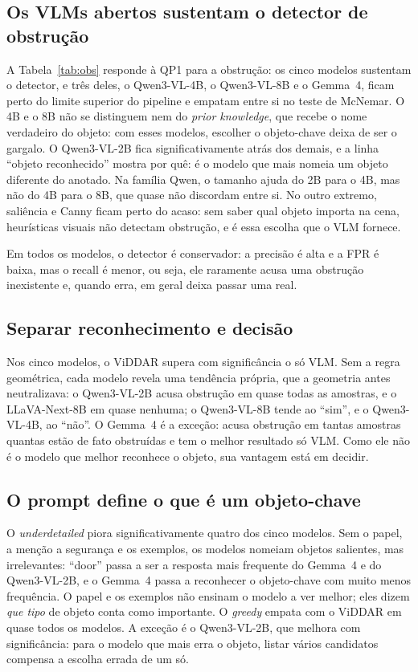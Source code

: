 \documentclass[conference]{IEEEtran}
\begin{document}
\subsection{Os VLMs abertos sustentam o detector de obstrução}
A Tabela~\ref{tab:obs} responde à QP1 para a obstrução: os cinco modelos sustentam o detector, e três
deles, o Qwen3-VL-4B, o Qwen3-VL-8B e o Gemma~4, ficam perto do limite superior do pipeline e empatam
entre si no teste de McNemar. O 4B e o 8B não se distinguem nem do \emph{prior knowledge}, que recebe o
nome verdadeiro do objeto: com esses modelos, escolher o objeto-chave deixa de ser o gargalo. O
Qwen3-VL-2B fica
significativamente atrás dos demais, e a linha ``objeto reconhecido'' mostra por quê: é o modelo que
mais nomeia um objeto diferente do anotado. Na família Qwen, o tamanho ajuda do 2B para o 4B, mas não do
4B para o 8B, que quase não discordam entre si. No outro extremo, saliência e Canny ficam perto do acaso:
sem saber qual objeto importa na cena, heurísticas visuais não detectam obstrução, e é essa escolha que o
VLM fornece.

Em todos os modelos, o detector é conservador: a precisão é alta e a FPR é baixa, mas o recall é menor,
ou seja, ele raramente acusa uma obstrução inexistente e, quando erra, em geral deixa passar uma real.

\subsection{Separar reconhecimento e decisão}
Nos cinco modelos, o ViDDAR supera com significância o só VLM. Sem a regra geométrica, cada modelo revela uma tendência própria, que a geometria antes neutralizava: o
Qwen3-VL-2B acusa obstrução em quase todas as amostras, e o LLaVA-Next-8B em quase nenhuma; o Qwen3-VL-8B
tende ao ``sim'', e o Qwen3-VL-4B, ao ``não''. O Gemma~4 é a exceção: acusa obstrução em tantas amostras
quantas estão de fato obstruídas e tem o melhor resultado só VLM. Como ele não é o modelo que melhor
reconhece o objeto, sua vantagem está em decidir.

\subsection{O prompt define o que é um objeto-chave}
O \emph{underdetailed} piora significativamente quatro dos cinco modelos. Sem o papel, a menção a
segurança e os exemplos, os modelos nomeiam objetos salientes,
mas irrelevantes: ``door'' passa a ser a resposta mais frequente do Gemma~4 e do Qwen3-VL-2B, e o Gemma~4
passa a reconhecer o objeto-chave com muito menos frequência. O papel e os exemplos não ensinam o modelo a
ver melhor; eles dizem \emph{que tipo} de objeto conta como importante. O \emph{greedy} empata com o
ViDDAR em quase todos os modelos. A exceção é o Qwen3-VL-2B, que melhora com significância: para o modelo
que mais erra o objeto, listar vários candidatos compensa a escolha errada de um só.
\end{document}

